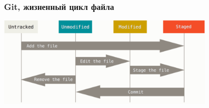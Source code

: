 \documentclass{../../slides-style}
\begin{document}
    \begin{frame}
        \frametitle{Git, жизненный цикл файла}
        \begin{center}
            \includegraphics[width=0.8\textwidth]{fileLifeCycle.png}
        \end{center}
    \end{frame}
\end{document}
